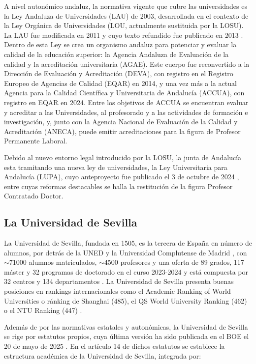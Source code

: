 \documentclass[a4paper,12pt,twoside]{article}
\begin{document}
A nivel autonómico andaluz, la normativa vigente que cubre las universidades es la Ley Andaluza de Universidades (LAU) de 2003, desarrollada en el contexto de la Ley Orgánica de Universidades (LOU, actualmente sustituida por la LOSU). La LAU fue modificada en 2011 y cuyo texto refundido fue publicado en 2013 \cite{lau}. Dentro de esta Ley se crea un organismo andaluz para potenciar y evaluar la calidad de la educación superior: la Agencia Andaluza de Evaluación de la calidad y la acreditación universitaria (AGAE). Este cuerpo fue reconvertido a la Dirección de Evaluación y Acreditación (DEVA), con registro en el Registro Europeo de Agencias de Calidad (EQAR) en 2014, y una vez más a la actual Agencia para la Calidad Científica y Universitaria de Andalucía (ACCUA), con registro en EQAR en 2024. Entre los objetivos de ACCUA se encuentran evaluar y acreditar a las Universidades, al profesorado y a las actividades de formación e investigación, y, junto con la Agencia Nacional de Evaluación de la Calidad y Acreditación (ANECA), puede emitir acreditaciones para la figura de Profesor Permanente Laboral.

Debido al nuevo entorno legal introducido por la LOSU, la junta de Andalucía esta tramitando una nueva ley de universidades, la Ley Universitaria para Andalucía (LUPA), cuyo anteproyecto fue publicado el 3 de octubre de 2024 \cite{lupa}, entre cuyas reformas destacables se halla la restitución de la figura Profesor Contratado Doctor.

\subsection{La Universidad de Sevilla}

La Universidad de Sevilla, fundada en 1505, es la tercera de España en número de alumnos, por detrás de la UNED y la Universidad Complutense de Madrid \cite{cifras}, con $\sim$71000 alumnos matriculados, $\sim$4500 profesores y una oferta de 89 grados, 117 máster y 32 programas de doctorado en el curso 2023-2024 y está compuesta por 32 centros y 134 departamentos \cite{us}. La Universidad de Sevilla presenta buenas posiciones en rankings internacionales como el Academic Ranking of World Universities o ránking de Shanghai (485), el QS World University Ranking (462) o el NTU Ranking (447) \cite{us}.

Además de por las normativas estatales y autonómicas, la Universidad de Sevilla se rige por estatutos propios, cuya última versión ha sido publicada en el BOE el 20 de mayo de 2025 \cite{estatutos}. En el artículo 14 de dichos estatutos se establece la estructura académica de la Universidad de Sevilla, integrada por:
\end{document}
